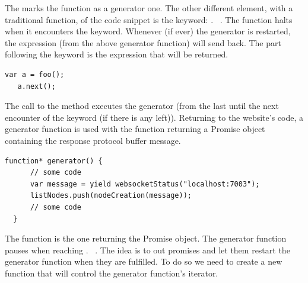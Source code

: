 \documentclass[11pt, a4paper, twoside, openright, openany]{article}
\begin{document}
The \say{*} marks the function as a generator one.
\newline
The other different element, with a traditional function, of the code snippet is the keyword: .
~\cite{yieldExpression}.
The function halts when it encounters the  keyword.
\newline
Whenever (if ever) the generator is restarted, the  expression (from the above generator function) will send
 back. The part following the  keyword is the expression that will
be returned.
\bigbreak

\begin{lstlisting}[caption={Restart of a generator function}, captionpos=b]
   var a = foo();
   a.next();
 \end{lstlisting}

The call to the  method executes the generator (from the last 
until the next encounter of the keyword (if there is any left)).
\newline
Returning to the website's code, a generator function is used with the function returning a Promise object
containing the response protocol buffer message.
\clearpage

\begin{lstlisting}[caption={Extract from the project's code}, captionpos=b]
  function* generator() {
      // some code
      var message = yield websocketStatus("localhost:7003");
      listNodes.push(nodeCreation(message));
      // some code
  }
\end{lstlisting}

The function  is the one returning the Promise object. The generator function
pauses when reaching . ~\cite{runGenerator}.
The idea is to  out promises and let them restart the generator function when
they are fulfilled.
\newline
To do so we need to create a new function that will control the generator function's iterator.
\bigbreak
\end{document}
